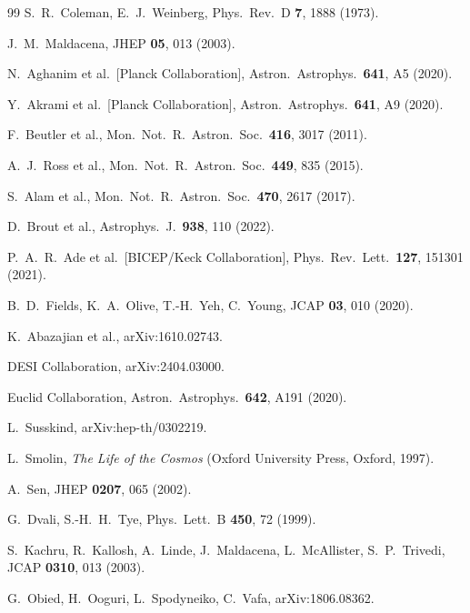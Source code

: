\documentclass[epj]{svjour}
\begin{document}
\begin{thebibliography}{99}
S.~R.~Coleman, E.~J.~Weinberg,
Phys.\ Rev.\ D \textbf{7}, 1888 (1973).

J.~M.~Maldacena,
JHEP \textbf{05}, 013 (2003).

N.~Aghanim et al.\ [Planck Collaboration],
Astron.\ Astrophys.\ \textbf{641}, A5 (2020).

Y.~Akrami et al.\ [Planck Collaboration],
Astron.\ Astrophys.\ \textbf{641}, A9 (2020).

F.~Beutler et al.,
Mon.\ Not.\ R.\ Astron.\ Soc.\ \textbf{416}, 3017 (2011).

A.~J.~Ross et al.,
Mon.\ Not.\ R.\ Astron.\ Soc.\ \textbf{449}, 835 (2015).

S.~Alam et al.,
Mon.\ Not.\ R.\ Astron.\ Soc.\ \textbf{470}, 2617 (2017).

D.~Brout et al.,
Astrophys.\ J.\ \textbf{938}, 110 (2022).

P.~A.~R.~Ade et al.\ [BICEP/Keck Collaboration],
Phys.\ Rev.\ Lett.\ \textbf{127}, 151301 (2021).

B.~D.~Fields, K.~A.~Olive, T.-H.~Yeh, C.~Young,
JCAP \textbf{03}, 010 (2020).

K.~Abazajian et al.,
arXiv:1610.02743.

DESI Collaboration,
arXiv:2404.03000.

Euclid Collaboration,
Astron.\ Astrophys.\ \textbf{642}, A191 (2020).

L.~Susskind,
arXiv:hep-th/0302219.

L.~Smolin,
\textit{The Life of the Cosmos}
(Oxford University Press, Oxford, 1997).

A.~Sen,
JHEP \textbf{0207}, 065 (2002).

G.~Dvali, S.-H.~H.~Tye,
Phys.\ Lett.\ B \textbf{450}, 72 (1999).

S.~Kachru, R.~Kallosh, A.~Linde, J.~Maldacena, L.~McAllister,
S.~P.~Trivedi,
JCAP \textbf{0310}, 013 (2003).

G.~Obied, H.~Ooguri, L.~Spodyneiko, C.~Vafa,
arXiv:1806.08362.


\end{thebibliography}
\end{document}
